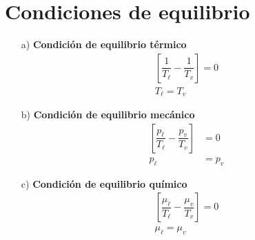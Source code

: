 \documentclass[../main]{subfiles}
\begin{document}
\section{Condiciones de equilibrio}
\begin{itemize}
    \item[a)] \textbf{Condición de equilibrio térmico}
    \begin{align}
        \left[ \dfrac{1}{T_{\ell}}-\dfrac{1}{T_v} \right]=0 \\
        T_{\ell}=T_v
    \end{align}
    \item[b)] \textbf{Condición de equilibrio mecánico}
    \begin{align}
        \left[ \dfrac{p_{\ell}}{T_{\ell}}-\dfrac{p_v}{T_v} \right]&=0 \\
        p_{\ell}&=p_v
    \end{align}
    \item[c)] \textbf{Condición de equilibrio químico}
    \begin{align}
        \left[ \dfrac{\mu_{\ell}}{T_{\ell}}-\dfrac{\mu_v}{T_v} \right]=0 \\
        \mu_{\ell}=\mu_v
    \end{align}
\end{itemize}
\end{document}
